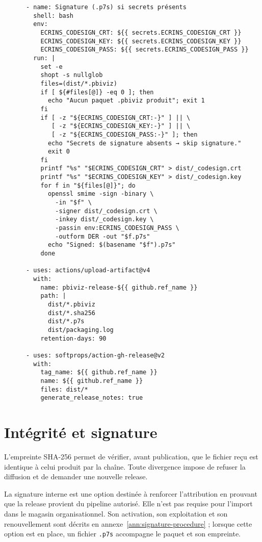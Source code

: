 \begin{verbatim}
      - name: Signature (.p7s) si secrets présents
        shell: bash
        env:
          ECRINS_CODESIGN_CRT: ${{ secrets.ECRINS_CODESIGN_CRT }}
          ECRINS_CODESIGN_KEY: ${{ secrets.ECRINS_CODESIGN_KEY }}
          ECRINS_CODESIGN_PASS: ${{ secrets.ECRINS_CODESIGN_PASS }}
        run: |
          set -e
          shopt -s nullglob
          files=(dist/*.pbiviz)
          if [ ${#files[@]} -eq 0 ]; then
            echo "Aucun paquet .pbiviz produit"; exit 1
          fi
          if [ -z "${ECRINS_CODESIGN_CRT:-}" ] || \
             [ -z "${ECRINS_CODESIGN_KEY:-}" ] || \
             [ -z "${ECRINS_CODESIGN_PASS:-}" ]; then
            echo "Secrets de signature absents → skip signature."
            exit 0
          fi
          printf "%s" "$ECRINS_CODESIGN_CRT" > dist/_codesign.crt
          printf "%s" "$ECRINS_CODESIGN_KEY" > dist/_codesign.key
          for f in "${files[@]}"; do
            openssl smime -sign -binary \
              -in "$f" \
              -signer dist/_codesign.crt \
              -inkey dist/_codesign.key \
              -passin env:ECRINS_CODESIGN_PASS \
              -outform DER -out "$f.p7s"
            echo "Signed: $(basename "$f").p7s"
          done

      - uses: actions/upload-artifact@v4
        with:
          name: pbiviz-release-${{ github.ref_name }}
          path: |
            dist/*.pbiviz
            dist/*.sha256
            dist/*.p7s
            dist/packaging.log
          retention-days: 90

      - uses: softprops/action-gh-release@v2
        with:
          tag_name: ${{ github.ref_name }}
          name: ${{ github.ref_name }}
          files: dist/*
          generate_release_notes: true
\end{verbatim}

\section{Intégrité et signature}
\label{sec:signature-principes}

L’empreinte SHA-256 permet de vérifier, avant publication, que le fichier reçu est identique à celui produit par la chaîne. Toute divergence impose de refuser la diffusion et de demander une nouvelle release.

La signature interne est une option destinée à renforcer l’attribution en prouvant que la release provient du pipeline autorisé. Elle n’est pas requise pour l’import dans le magasin organisationnel. Son activation, son exploitation et son renouvellement sont décrits en annexe~\ref{ann:signature-procedure} ; lorsque cette option est en place, un fichier \texttt{.p7s} accompagne le paquet et son empreinte.

